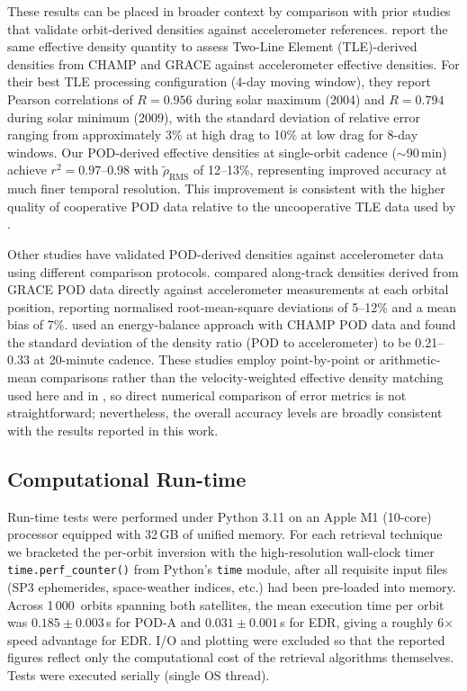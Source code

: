 \documentclass{agujournal2019}
\begin{document}
These results can be placed in broader context by comparison with prior
studies that validate orbit-derived densities against accelerometer
references.  report the same effective density
quantity to assess Two-Line Element (TLE)-derived densities from CHAMP
and GRACE against accelerometer effective densities. For their best TLE processing
configuration (4-day moving window), they report Pearson correlations
of $R = 0.956$ during solar maximum (2004) and $R = 0.794$ during
solar minimum (2009), with the standard deviation of relative error
ranging from approximately 3\% at high drag to 10\% at low drag for
8-day windows. Our POD-derived effective densities at single-orbit
cadence ($\sim$90\,min) achieve $r^{2} = 0.97$--$0.98$ with
$\tilde{\rho}_{\text{RMS}}$ of 12--13\%, representing improved accuracy at
much finer temporal resolution. This improvement is consistent with the higher quality of cooperative
POD data relative to the uncooperative TLE data used by
.

Other studies have validated POD-derived densities against
accelerometer data using different comparison protocols.
 compared along-track densities
derived from GRACE POD data directly against accelerometer
measurements at each orbital position, reporting normalised
root-mean-square deviations of 5--12\% and a mean bias of 7\%.  used an energy-balance approach
with CHAMP POD data and found the standard deviation of the
density ratio (POD to accelerometer) to be 0.21--0.33 at 20-minute
cadence. These studies employ point-by-point or
arithmetic-mean comparisons rather than the velocity-weighted
effective density matching used here and in
, so direct numerical comparison of
error metrics is not straightforward; nevertheless, the overall
accuracy levels are broadly consistent with the results reported in
this work.

\subsection{Computational Run-time}
\label{sec:runtime}
Run-time tests were performed under Python 3.11 on an Apple M1 (10-core)
processor equipped with 32\,GB of unified memory. For each retrieval
technique we bracketed the per-orbit inversion with the high-resolution
wall-clock timer \texttt{time.perf\_counter()} from Python's \texttt{time}
module, after all requisite input files (SP3 ephemerides, space-weather
indices, etc.) had been pre-loaded into memory. Across
1\,000~orbits spanning both satellites, the mean execution time per orbit was
$0.185 \pm 0.003$\,s for POD-A and $0.031 \pm 0.001$\,s for EDR, giving a
roughly 6$\times$ speed advantage for EDR. I/O and plotting were excluded so
that the reported figures reflect only the computational cost of the retrieval
algorithms themselves. Tests were executed serially (single OS thread).
\end{document}
